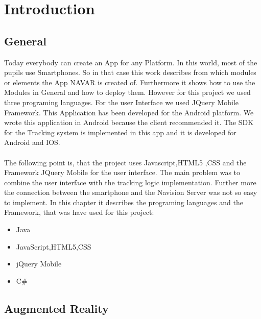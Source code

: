 \chapter{Introduction} 
\section{General}
 Today everybody can create an App for any Platform. In this world, most of the pupils use Smartphones. So in that case this work describes from which modules or elements  the App NAVAR is created of.  Furthermore it shows how to use the Modules in General and how to deploy them. However for this project we used three programing languages. For the user Interface we used JQuery Mobile Framework. This Application has been developed for the Android platform.  We wrote this application in Android because the client recommended it. The SDK  for the Tracking system is implemented  in this app and it is developed for Android and IOS.   
 \\\\
 The following point is, that the project uses Javascript,HTML5 ,CSS  and the Framework JQuery Mobile for the user interface. The main problem was to combine the user interface with the tracking logic implementation. Further more the connection between the smartphone and the Navision Server was not so easy to implement.
 In this chapter it describes the programing languages and the Framework, that was have used for this project:
 \begin{itemize}
 \item Java
 \item JavaScript,HTML5,CSS
 \item jQuery Mobile
 \item C\#
 \end{itemize}
 \newpage
 \section{Augmented Reality}
